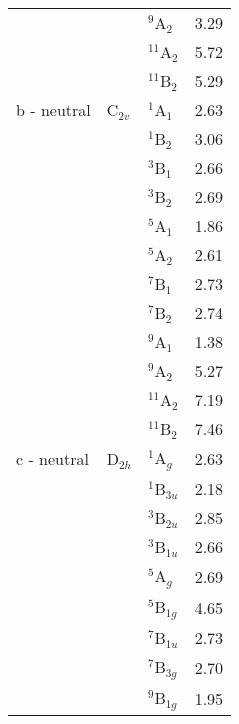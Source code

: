 \begin{center}
\begin{longtable}{llll}
                &          & $^9$A$_2$       & 3.29                 \\
                &          & $^{11}$A$_2$    & 5.72                 \\
                &          & $^{11}$B$_2$    & 5.29                 \\ \midrule
    b - neutral & C$_{2v}$ & $^1$A$_1$       & 2.63                 \\
                &          & $^1$B$_2$       & 3.06                 \\
                &          & $^3$B$_1$       & 2.66                 \\
                &          & $^3$B$_2$       & 2.69                 \\
                &          & $^5$A$_1$       & 1.86                 \\
                &          & $^5$A$_2$       & 2.61                 \\
                &          & $^7$B$_1$       & 2.73                 \\
                &          & $^7$B$_2$       & 2.74                 \\
                &          & $^9$A$_1$       & 1.38                 \\
                &          & $^9$A$_2$       & 5.27                 \\
                &          & $^{11}$A$_2$    & 7.19                 \\
                &          & $^{11}$B$_2$    & 7.46                 \\ \midrule
    c - neutral & D$_{2h}$ & $^1$A$_g$       & 2.63                 \\
                &          & $^1$B$_{3u}$    & 2.18                 \\
                &          & $^3$B$_{2u}$    & 2.85                 \\
                &          & $^3$B$_{1u}$    & 2.66                 \\
                &          & $^5$A$_g$       & 2.69                 \\
                &          & $^5$B$_{1g}$    & 4.65                 \\
                &          & $^7$B$_{1u}$    & 2.73                 \\
                &          & $^7$B$_{3g}$    & 2.70                 \\
                &          & $^9$B$_{1g}$    & 1.95                 \\

\end{longtable}
\end{center}
